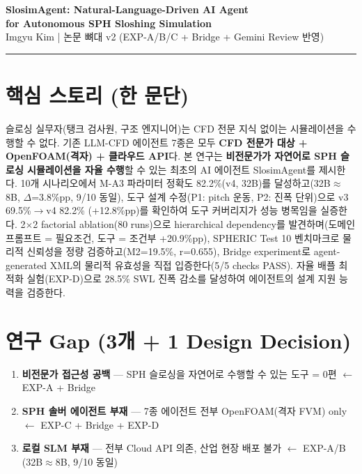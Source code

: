 \documentclass[11pt,a4paper]{article}
\begin{document}
\begin{center}
{\Large\bfseries SlosimAgent: Natural-Language-Driven AI Agent\\for Autonomous SPH Sloshing Simulation}\\[1em]
{\normalsize Imgyu Kim \quad | \quad 논문 뼈대 v2 (EXP-A/B/C + Bridge + Gemini Review 반영)}
\end{center}

\vspace{0.5em}\hrule\vspace{1em}

\section{핵심 스토리 (한 문단)}

슬로싱 실무자(탱크 검사원, 구조 엔지니어)는 CFD 전문 지식 없이는 시뮬레이션을 수행할 수 없다.
기존 LLM-CFD 에이전트 7종은 모두 \textbf{CFD 전문가 대상 + OpenFOAM(격자) + 클라우드 API}다.
본 연구는 \textbf{비전문가가 자연어로 SPH 슬로싱 시뮬레이션을 자율 수행}할 수 있는 최초의 AI 에이전트 SlosimAgent를 제시한다.
10개 시나리오에서 M-A3 파라미터 정확도 82.2\%(v4, 32B)를 달성하고(32B$\approx$8B, $\Delta$=3.8\%pp, 9/10 동일),
도구 설계 수정(P1: pitch 운동, P2: 진폭 단위)으로 v3 69.5\%$\rightarrow$v4 82.2\% (+12.8\%pp)를 확인하여 도구 커버리지가 성능 병목임을 실증한다.
2$\times$2 factorial ablation(80 runs)으로 hierarchical dependency를 발견하며(도메인 프롬프트 = 필요조건, 도구 = 조건부 +20.9\%pp),
SPHERIC Test 10 벤치마크로 물리적 신뢰성을 정량 검증하고(M2=19.5\%, r=0.655),
Bridge experiment로 agent-generated XML의 물리적 유효성을 직접 입증한다(5/5 checks PASS).
자율 배플 최적화 실험(EXP-D)으로 28.5\% SWL 진폭 감소를 달성하여 에이전트의 설계 지원 능력을 검증한다.

\section{연구 Gap (3개 + 1 Design Decision)}

\begin{enumerate}[nosep,leftmargin=1.5em]
\item \textbf{비전문가 접근성 공백} --- SPH 슬로싱을 자연어로 수행할 수 있는 도구 = 0편 $\leftarrow$ EXP-A + Bridge
\item \textbf{SPH 솔버 에이전트 부재} --- 7종 에이전트 전부 OpenFOAM(격자 FVM) only $\leftarrow$ EXP-C + Bridge + EXP-D
\item \textbf{로컬 SLM 부재} --- 전부 Cloud API 의존, 산업 현장 배포 불가 $\leftarrow$ EXP-A/B (32B$\approx$8B, 9/10 동일)
\end{enumerate}
\end{document}
